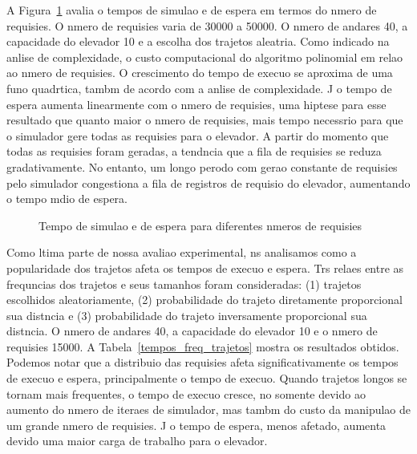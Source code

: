 \documentclass[12pt]{article}
\begin{document}
A Figura~\ref{tempo_n_requisicoes} avalia o tempos de simulao e de espera em termos do nmero de requisies. O nmero de requisies varia de 30000 a 50000. O nmero de andares  40, a capacidade do elevador  10 e a escolha dos trajetos  aleatria. Como indicado na anlise de complexidade, o custo computacional do algoritmo  polinomial em relao ao nmero de requisies. O crescimento do tempo de execuo se aproxima de uma funo quadrtica, tambm de acordo com a anlise de complexidade. J o tempo de espera aumenta linearmente com o nmero de requisies, uma hiptese para esse resultado  que quanto maior o nmero de requisies, mais tempo  necessrio para que o simulador gere todas as requisies para o elevador. A partir do momento que todas as requisies foram geradas, a tendncia  que a fila de requisies se reduza gradativamente. No entanto, um longo perodo com gerao constante de requisies pelo simulador congestiona a fila de registros de requisio do elevador, aumentando o tempo mdio de espera.

\begin{figure}[ht!]
\centering
{}
\caption{Tempo de simulao e de espera para diferentes nmeros de requisies \label{tempo_n_requisicoes}}
\end{figure}

Como ltima parte de nossa avaliao experimental, ns analisamos como a popularidade dos trajetos afeta os tempos de execuo e espera. Trs relaes entre as frequncias dos trajetos e seus tamanhos foram consideradas: (1) trajetos escolhidos aleatoriamente, (2) probabilidade do trajeto diretamente proporcional  sua distncia e (3) probabilidade do trajeto inversamente proporcional  sua distncia. O nmero de andares  40, a capacidade do elevador  10 e o nmero de requisies  15000. A Tabela~\ref{tempos_freq_trajetos} mostra os resultados obtidos. Podemos notar que a distribuio das requisies afeta significativamente os tempos de execuo e espera, principalmente o tempo de execuo. Quando trajetos longos se tornam mais frequentes, o tempo de execuo cresce, no somente devido ao aumento do nmero de iteraes de simulador, mas tambm do custo da manipulao de um grande nmero de requisies. J o tempo de espera, menos afetado, aumenta devido  uma maior carga de trabalho para o elevador.
\end{document}
